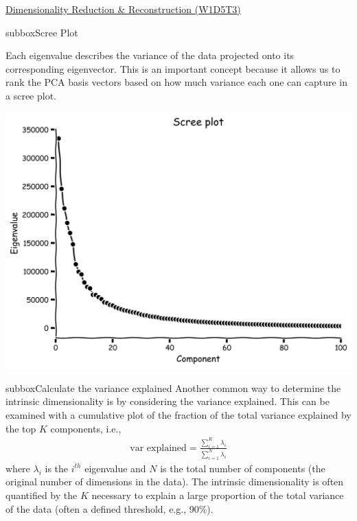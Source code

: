 \begin{textbox}{\href{https://compneuro.neuromatch.io/tutorials/W1D5_DimensionalityReduction/student/W1D5_Tutorial3.html}{Dimensionality Reduction \& Reconstruction (W1D5T3)} }
\begin{subbox}{subbox}{Scree Plot}
\scriptsize

Each eigenvalue describes the variance of the data projected onto its corresponding eigenvector. This is an important concept because it allows us to rank the PCA basis vectors based on how much variance each one can capture in a scree plot.

\centering
\includegraphics[scale=0.15]{Figures/DM/DMFigure3.png}

\end{subbox}

\begin{subbox}{subbox}{Calculate the variance explained
}
\scriptsize
Another common way to determine the intrinsic dimensionality is by considering the variance explained. This can be examined with a cumulative plot of the fraction of the total variance explained by the top $K$ components, i.e.,
\begin{align}
\text{var explained} = \frac{\sum_{i=1}^K \lambda_i}{\sum_{i=1}^N \lambda_i}
\end{align}
where $\lambda_i$ is the $i^{th}$ eigenvalue and $N$ is the total number of components (the original number of dimensions in the data).
The intrinsic dimensionality is often quantified by the $K$ necessary to explain a large proportion of the total variance of the data (often a defined threshold, e.g., 90\%).


\end{subbox}
\end{textbox}
